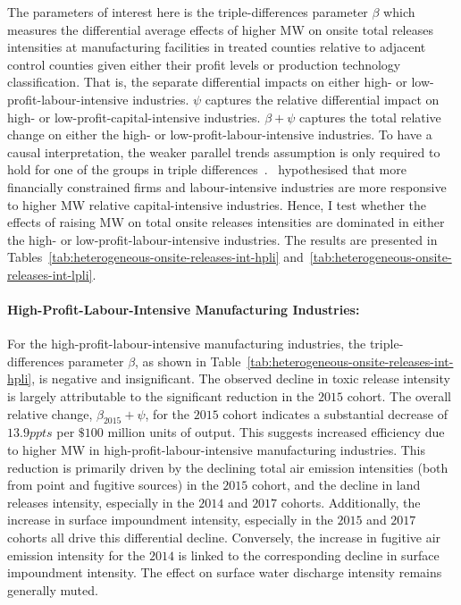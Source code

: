 \documentclass{C:/Users/david/OneDrive/Documents/ULMS/PhD/Thesis/chapter3/src/climate_change/latex/Economic_Journal/OUP-EJ}
\begin{document}
    The parameters of interest here is the triple-differences parameter $\beta$ which measures the differential average effects of higher MW on onsite total releases intensities at manufacturing facilities in treated counties relative to adjacent control counties given either their profit levels or production technology classification. That is, the separate differential impacts on either high- or low-profit-labour-intensive industries. $\psi$ captures the relative differential impact on high- or low-profit-capital-intensive industries. $\beta + \psi$ captures the total relative change on either the high- or low-profit-labour-intensive industries. To have a causal interpretation, the weaker parallel trends assumption is only required to hold for one of the groups in triple differences~\citep{olden2022triple}.~\citet{zhang2023unintended} hypothesised that more financially constrained firms and labour-intensive industries are more responsive to higher MW relative capital-intensive industries. Hence, I test whether the effects of raising MW on total onsite releases intensities are dominated in either the high- or low-profit-labour-intensive industries. The results are presented in Tables~\ref{tab:heterogeneous-onsite-releases-int-hpli} and~\ref{tab:heterogeneous-onsite-releases-int-lpli}.

    \paragraph{High-Profit-Labour-Intensive Manufacturing Industries:}
    For the high-profit-labour-intensive manufacturing industries, the triple-differences parameter $\beta$, as shown in Table~\ref{tab:heterogeneous-onsite-releases-int-hpli}, is negative and insignificant. The observed decline in toxic release intensity is largely attributable to the significant reduction in the $2015$ cohort. The overall relative change, $\beta_{2015} + \psi$, for the $2015$ cohort indicates a substantial decrease of $13.9ppts$ per $\$100$ million units of output. This suggests increased efficiency due to higher MW in high-profit-labour-intensive manufacturing industries. This reduction is primarily driven by the declining total air emission intensities (both from point and fugitive sources) in the $2015$ cohort, and the decline in land releases intensity, especially in the $2014$ and $2017$ cohorts. Additionally, the increase in surface impoundment intensity, especially in the $2015$ and $2017$ cohorts all drive this differential decline. Conversely, the increase in fugitive air emission intensity for the $2014$ is linked to the corresponding decline in surface impoundment intensity. The effect on surface water discharge intensity remains generally muted.
    
\end{document}

